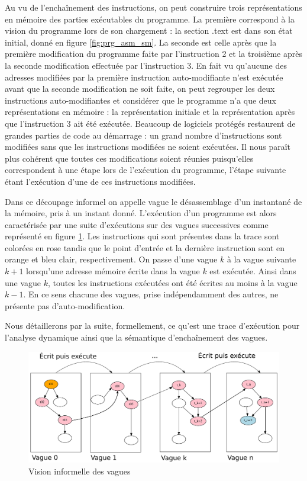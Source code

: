 Au vu de l'enchaînement des instructions, on peut construire trois représentations en mémoire des parties exécutables du programme.
La première correspond à la vision du programme lors de son chargement : la section .text est dans son état initial, donné en figure \ref{fig:prg_asm_sm}.
La seconde est celle après que la première modification du programme faite par l'instruction 2 et la troisième après la seconde modification effectuée par l'instruction 3.
En fait vu qu'aucune des adresses modifiées par la première instruction auto-modifiante n'est exécutée avant que la seconde modification ne soit faite, on peut regrouper les deux instructions auto-modifiantes et considérer que le programme n'a que deux représentations en mémoire : la représentation initiale et la représentation après que l'instruction 3 ait été exécutée. 
Beaucoup de logiciels protégés restaurent de grandes parties de code au démarrage : un grand nombre d'instructions sont modifiées sans que les instructions modifiées ne soient exécutées. 
Il nous paraît plus cohérent que toutes ces modifications soient réunies puisqu'elles correspondent à une étape lors de l'exécution du programme, l'étape suivante étant l'exécution d'une de ces instructions modifiées.

Dans ce découpage informel on appelle vague le désassemblage d'un instantané de la mémoire, pris à un instant donné. 
L'exécution d'un programme est alors caractérisée par une suite d'exécutions sur des vagues successives comme représenté en figure \ref{fig:vagues_visuel}. Les instructions qui sont présentes dans la trace sont colorées en rose tandis que le point d'entrée et la dernière instruction sont en orange et bleu clair, respectivement.
On passe d'une vague $k$ à la vague suivante $k+1$ lorsqu'une adresse mémoire écrite dans la vague $k$ est exécutée.
Ainsi dans une vague $k$, toutes les instructions exécutées ont été écrites au moins à la vague $k-1$. 
En ce sens chacune des vagues, prise indépendamment des autres, ne présente pas d'auto-modification.

Nous détaillerons par la suite, formellement, ce qu'est une trace d'exécution pour l'analyse dynamique ainsi que la sémantique d'enchaînement des vagues.

\begin{figure}
 \includegraphics[width=1.0\textwidth]{supports/automodification/phases2_final.pdf}
 \caption{Vision informelle des vagues}
 \label{fig:vagues_visuel}
\end{figure}


